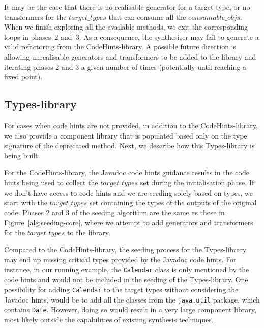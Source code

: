\documentclass[sigconf,review,anonymous]{acmart}
\begin{document}
It may be the case that there is no realisable generator for a target type,
or no transformers for the $\mathit{target\_types}$ that can consume all the
$\mathit{consumable\_objs}$.  When we finish exploring all the available
methods, we exit the corresponding loops in phases~2 and~3.  As a
consequence, the synthesiser may fail to generate a valid refactoring from
the CodeHints-library.
%
A possible future direction is allowing unrealisable generators and transformers to be added to the library and iterating phases 2 and 3 a given number of times (potentially until reaching a fixed point).

\subsection{Types-library} \label{sec:extend-library}

For cases when code hints are not provided, in addition to the CodeHints-library, we also provide a component library that is populated based only on the type signature
of the deprecated method. Next, we describe how this Types-library is being built.

For the CodeHints-library, the Javadoc code hints guidance results in the code hints being
used to collect the $target\_types$ set during the initialisation phase.
If we don't have access to code hints and we are seeding solely
based on types, we start with the $target\_types$ set containing
the types %
of the outputs of the original code. %
Phases 2 and 3 of the seeding algorithm are the same as those in Figure~\ref{alg:seeding-core},
where we attempt to add generators and transformers for the $target\_types$ to the library.


Compared to the CodeHints-library, the seeding process for the Types-library may end up missing critical types provided by the Javadoc code hints. For instance, in our running example, the \lstinline[breaklines=true]{Calendar} class is only mentioned by the
code hints and would not be included in the seeding of the Types-library.
One possibility for adding
\lstinline[breaklines=true]{Calendar} to the target types without considering
the Javadoc hints, would be to add all the classes from the
\lstinline[breaklines=true]{java.util} package, which contains \lstinline[breaklines=true]{Date}. However, doing so would result
in a very large component library, most likely outside the capabilities of existing
synthesis techniques.
\end{document}
